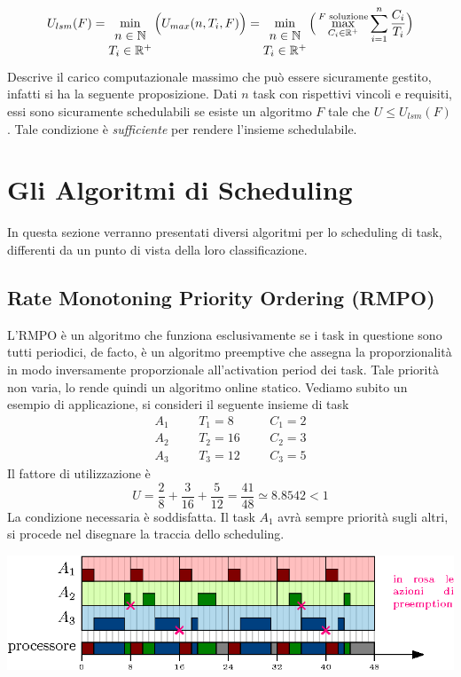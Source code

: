 \documentclass[10pt, letterpaper]{report}
\begin{document}
$$ U_{lsm}(F)=\min_{\begin{matrix}
n\in{\mathbb N} \\ T_i\in{\mathbb R}^+
\end{matrix}}\Big(U_{max}(n,T_i,F)\Big)= 
\min_{\begin{matrix}
    n\in{\mathbb N} \\ T_i\in{\mathbb R}^+
    \end{matrix}}\Big(
        \max_{C_i\in{\mathbb R}^+}^{F \text{ soluzione}}\sum_{i=1}^n\frac{C_i}{T_i}
    \Big)$$
Descrive il carico computazionale massimo che può essere sicuramente gestito, infatti si ha la seguente proposizione.\acc 
\prop{} Dati $n$ task con rispettivi vincoli e requisiti, essi sono sicuramente schedulabili 
se esiste un algoritmo $F$ tale che $U\le U_{lsm}(F)$. Tale condizione è \textit{sufficiente} per 
rendere l'insieme schedulabile.\flowerLine 
\section{Gli Algoritmi di Scheduling}
In questa sezione verranno presentati diversi algoritmi per lo scheduling di task, differenti da un 
punto di vista della loro classificazione.
\subsection{Rate Monotoning Priority Ordering (RMPO)}
L'RMPO è un algoritmo che funziona esclusivamente se i task in questione sono tutti periodici, 
de facto, è un algoritmo preemptive che assegna la proporzionalità in modo inversamente 
proporzionale all'activation period dei task. Tale priorità non varia, lo rende quindi un 
algoritmo online statico. Vediamo subito un esempio di applicazione, si consideri il seguente insieme 
di task
$$ 
\begin{matrix}
    A_1 & & & T_1=8 & & & C_1 =2\\ 
    A_2 & & & T_2=16 & & & C_2=3 \\ 
    A_3 & & &T_3=12 &&& C_3=5
\end{matrix}
$$
Il fattore di utilizzazione è $$ U=\frac{2}{8}+\frac{3}{16}+\frac{5}{12}=\frac{41}{48}\simeq 8.8542<1$$
La condizione necessaria è soddisfatta. Il task $A_1$ avrà sempre priorità sugli altri, si procede nel 
disegnare la traccia dello scheduling.\begin{center}
    \includegraphics[width=1.1\textwidth ]{images/esempioRMPO.eps}
\end{center}
\end{document}

